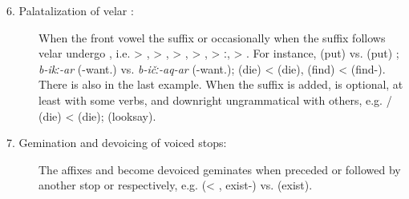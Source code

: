 {\begin{description}
\item[6. Palatalization of velar :] When the front vowel  the  suffix  or occasionally when the  suffix  follows velar  undergo , i.e.  > , > ,  > ,  > ,  > ː,  > . For instance,  (put)  vs.  (put) ; \textit{b-ikː-ar} (-want.) vs. \textit{b-ičː-aq-ar} (-want.);  (die) <  (die),  (find) <  (find-). There is also  in the last example. When the  suffix is added,  is optional, at least with some verbs, and downright ungrammatical with others, e.g. \slash{} (die) <  (die);  (looksay).
\item[7. Gemination and devoicing of voiced stops:] The  affixes  and  become devoiced geminates when preceded or followed by another stop  or  respectively, e.g.  (< , exist-) vs.  (exist).
\end{description}}

